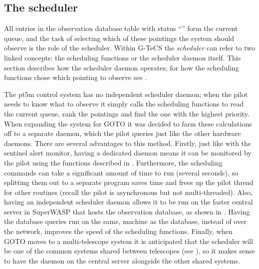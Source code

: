 \subsection{The scheduler}
\label{sec:scheduler}
\begin{colsection}

All entries in the observation database  table with status ``'' form the current queue, and the task of selecting which of these pointings the system should observe is the role of the scheduler. Within G-TeCS the \emph{scheduler} can refer to two linked concepts: the scheduling functions or the scheduler daemon itself. This section describes how the scheduler daemon operates; for how the scheduling functions chose which pointing to observe see .

The pt5m control system has no independent scheduler daemon; when the pilot needs to know what to observe it simply calls the scheduling functions to read the current queue, rank the pointings and find the one with the highest priority. When expanding the system for GOTO it was decided to farm these calculations off to a separate daemon, which the pilot queries just like the other hardware daemons. There are several advantages to this method. Firstly, just like with the sentinel alert monitor, having a dedicated daemon means it can be monitored by the pilot using the functions described in . Furthermore, the scheduling commands can take a significant amount of time to run (several seconds), so splitting them out to a separate program saves time and frees up the pilot thread for other routines (recall the pilot is asynchronous but not multi-threaded). Also, having an independent scheduler daemon allows it to be run on the faster central server in SuperWASP that hosts the observation database, as shown in . Having the database queries run on the same, machine as the database, instead of over the network, improves the speed of the scheduling functions. Finally, when GOTO moves to a multi-telescope system it is anticipated that the scheduler will be one of the common systems shared between telescopes (see ), so it makes sense to have the daemon on the central server alongside the other shared systems.


\end{colsection}
